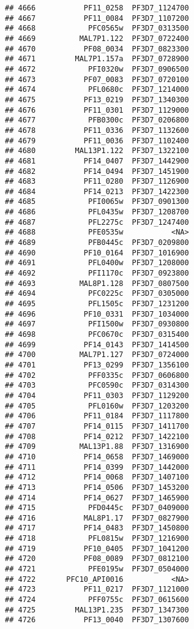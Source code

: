 \documentclass[12pt, a4paper]{article}\usepackage[]{graphicx}\usepackage[]{color}
\makeatletter
\newenvironment{kframe}{%
 \def\at@end@of@kframe{}%
 \ifinner\ifhmode%
  \def\at@end@of@kframe{\end{minipage}}%
  \begin{minipage}{\columnwidth}%
 \fi\fi%
 \def\FrameCommand##1{\hskip\@totalleftmargin \hskip-\fboxsep
 \colorbox{shadecolor}{##1}\hskip-\fboxsep
     \hskip-\linewidth \hskip-\@totalleftmargin \hskip\columnwidth}%
 \MakeFramed {\advance\hsize-\width
   \@totalleftmargin\z@ \linewidth\hsize
   \@setminipage}}%
 {\par\unskip\endMakeFramed%
 \at@end@of@kframe}
\newenvironment{knitrout}{}{} %
\makeatother
\begin{document}
\begin{knitrout}
\begin{kframe}
\begin{verbatim}
## 4666           PF11_0258  PF3D7_1124700
## 4667           PF11_0084  PF3D7_1107200
## 4668            PFC0565w  PF3D7_0313500
## 4669          MAL7P1.122  PF3D7_0722400
## 4670           PF08_0034  PF3D7_0823300
## 4671         MAL7P1.157a  PF3D7_0728900
## 4672            PFI0320w  PF3D7_0906500
## 4673           PF07_0083  PF3D7_0720100
## 4674            PFL0680c  PF3D7_1214000
## 4675           PF13_0219  PF3D7_1340300
## 4676           PF11_0301  PF3D7_1129000
## 4677            PFB0300c  PF3D7_0206800
## 4678           PF11_0336  PF3D7_1132600
## 4679           PF11_0036  PF3D7_1102400
## 4680         MAL13P1.122  PF3D7_1322100
## 4681           PF14_0407  PF3D7_1442900
## 4682           PF14_0494  PF3D7_1451900
## 4683           PF11_0280  PF3D7_1126900
## 4684           PF14_0213  PF3D7_1422300
## 4685            PFI0065w  PF3D7_0901300
## 4686            PFL0435w  PF3D7_1208700
## 4687            PFL2275c  PF3D7_1247400
## 4688            PFE0535w           <NA>
## 4689            PFB0445c  PF3D7_0209800
## 4690           PF10_0164  PF3D7_1016900
## 4691            PFL0400w  PF3D7_1208000
## 4692            PFI1170c  PF3D7_0923800
## 4693          MAL8P1.128  PF3D7_0807500
## 4694            PFC0225c  PF3D7_0305000
## 4695            PFL1505c  PF3D7_1231200
## 4696           PF10_0331  PF3D7_1034000
## 4697            PFI1500w  PF3D7_0930800
## 4698            PFC0670c  PF3D7_0315400
## 4699           PF14_0143  PF3D7_1414500
## 4700          MAL7P1.127  PF3D7_0724000
## 4701           PF13_0299  PF3D7_1356100
## 4702            PFF0335c  PF3D7_0606800
## 4703            PFC0590c  PF3D7_0314300
## 4704           PF11_0303  PF3D7_1129200
## 4705            PFL0160w  PF3D7_1203200
## 4706           PF11_0184  PF3D7_1117800
## 4707           PF14_0115  PF3D7_1411700
## 4708           PF14_0212  PF3D7_1422100
## 4709          MAL13P1.88  PF3D7_1316900
## 4710           PF14_0658  PF3D7_1469000
## 4711           PF14_0399  PF3D7_1442000
## 4712           PF14_0068  PF3D7_1407100
## 4713           PF14_0506  PF3D7_1453200
## 4714           PF14_0627  PF3D7_1465900
## 4715            PFD0445c  PF3D7_0409000
## 4716           MAL8P1.17  PF3D7_0827900
## 4717           PF14_0483  PF3D7_1450800
## 4718            PFL0815w  PF3D7_1216900
## 4719           PF10_0405  PF3D7_1041200
## 4720           PF08_0089  PF3D7_0812100
## 4721            PFE0195w  PF3D7_0504000
## 4722       PFC10_API0016           <NA>
## 4723           PF11_0217  PF3D7_1121000
## 4724            PFF0755c  PF3D7_0615600
## 4725         MAL13P1.235  PF3D7_1347300
## 4726           PF13_0040  PF3D7_1307600

\end{verbatim}
\end{kframe}
\end{knitrout}
\end{document}
